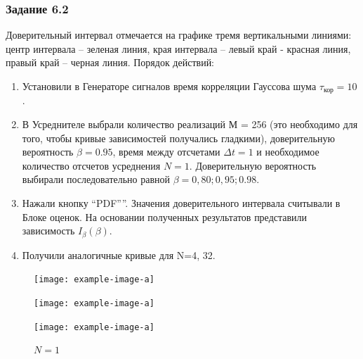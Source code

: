 \subsubsection[Задание 6.1]{Задание 6.2}
Доверительный интервал отмечается на графике тремя вертикальными линиями: центр интервала – зеленая линия, края интервала – левый край - красная линия, правый край – черная линия.
Порядок действий:
\begin{enumerate}
	\item Установили в Генераторе сигналов время корреляции Гауссова шума $\tau_\text{кор}=10$.
	\item В Усреднителе выбрали количество реализаций М = 256 (это необходимо для того, чтобы кривые зависимостей получались гладкими), доверительную вероятность $\beta = 0.95$, время между отсчетами $\Delta t = 1$ и необходимое количество отсчетов усреднения $N=1$. Доверительную вероятность выбирали последовательно равной $\beta = 0,80; 0,95; 0.98$.
	\item Нажали кнопку “PDF””. Значения доверительного интервала считывали в Блоке оценок. На основании полученных результатов представили зависимость $I_{\beta}(\beta)$.
	\item Получили аналогичные кривые для N=4, 32.
\end{enumerate}

 \begin{figure}[H]
	\begin{minipage}{0.3\linewidth}
		\centering
		\texttt{[image: example-image-a]}
		\caption*{$\beta =0.8$}
	\end{minipage}
	\begin{minipage}{0.3\linewidth}
		\centering
		\texttt{[image: example-image-a]}
		\caption*{$\beta =0.95$}
	\end{minipage}
	\begin{minipage}{0.3\linewidth}
		\centering
		\texttt{[image: example-image-a]}
		\caption*{$\beta =0.98$}
	\end{minipage}
\caption*{$N=1$}
\end{figure}

